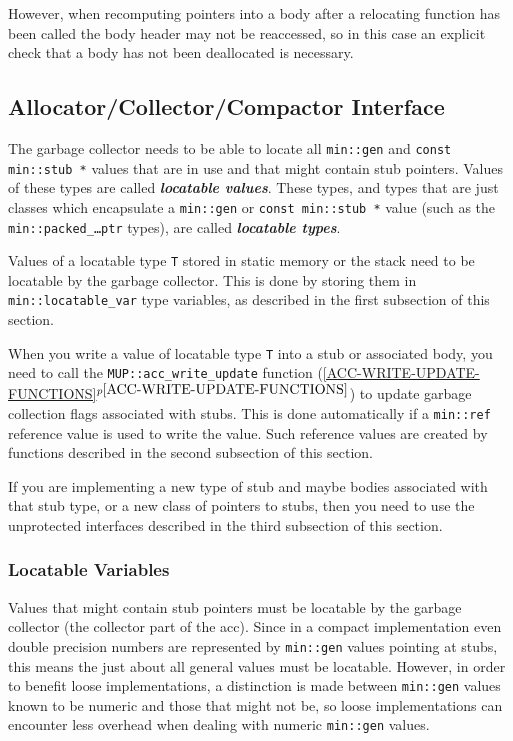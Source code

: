 \documentclass[12pt]{article}
\newcommand{\skey}[2]{{\bf \em #1#2}\index{#1}}
\newcommand{\itemref}[1]{\ref{#1}$^{p\pageref{#1}}$}
\newcommand{\EOL}{\penalty \exhyphenpenalty}
\begin{document}
However, when recomputing pointers into a body after a relocating
function has been called the body header may not be reaccessed,
so in this case an explicit check that a body has not been deallocated
is necessary.

\subsection{Allocator/Collector/Compactor Interface}
\label{ACC-INTERFACE}

The garbage collector needs to be able to locate all
\verb|min::gen| and {\tt const min::\EOL stub~*} values
that are in use and that might contain stub pointers.
Values of these types are called \skey{locatable value}s.%
\label{LOCATABLE-VALUE}
These types, and types that are just classes which
encapsulate a {\tt min::\EOL gen} or {\tt const min::\EOL stub~*}
value (such as the {\tt min::packed\_\ldots ptr} types),
are called \skey{locatable type}s.%
\label{LOCATABLE-TYPE}

Values of a locatable type {\tt T} stored in static memory or the stack
need to be locatable by the garbage collector.  This is done
by storing them in {\tt min::\EOL locatable\_\EOL var\TARG} type
variables, as described in the first subsection of this section.

When you write a value of locatable type {\tt T} into a stub or associated
body, you need to call the {\tt MUP::\EOL acc\_\EOL write\_\EOL update}
function (\itemref{ACC-WRITE-UPDATE-FUNCTIONS}) to update garbage
collection flags associated with stubs.
This is done automatically if a {\tt min::\EOL ref\TARG} reference value is
used to write the value.  Such reference values are created
by functions described in the second subsection of this section.

If you are implementing a new type of stub and maybe bodies
associated with that stub type, or a new class of pointers to stubs,
then you need to use the unprotected
interfaces described in the third subsection of this section.

\subsubsection{Locatable Variables}
\label{LOCATABLE-VARIABLES}

Values that might contain stub pointers must be locatable
by the garbage collector (the collector part of the acc).  Since
in a compact implementation even double precision numbers are
represented by \verb|min::gen| values pointing at stubs, this means
the just about all general values must be locatable.  However,
in order to benefit loose implementations, a distinction is made
between \verb|min::gen| values known to be numeric and those
that might not be, so loose implementations can encounter less overhead
when dealing with numeric \verb|min::gen| values.
\end{document}
